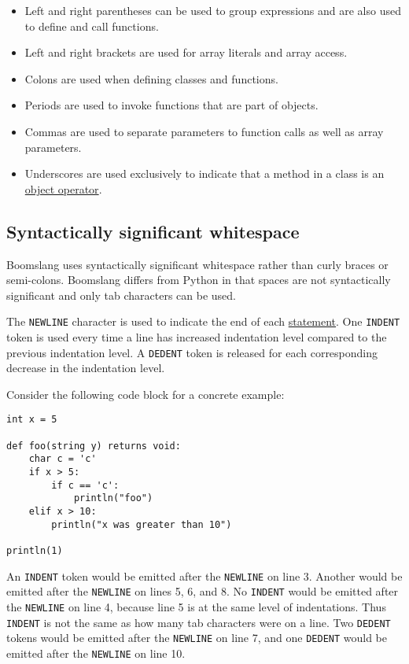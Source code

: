 \documentclass{article}
\begin{document}
\begin{itemize}
\item Left and right parentheses can be used to group expressions and are also used to define and call functions.

\item Left and right brackets are used for array literals and array access.

\item Colons are used when defining classes and functions.

\item Periods are used to invoke functions that are part of objects.

\item Commas are used to separate parameters to function calls as well as array parameters.

\item Underscores are used exclusively to indicate that a method in a class is an \hyperref[sec:object-operators]{object operator}.
\end{itemize}

\subsection{Syntactically significant whitespace}
Boomslang uses syntactically significant whitespace rather than curly braces or semi-colons. Boomslang differs from Python in that spaces are not syntactically significant and only tab characters can be used.

The \texttt{NEWLINE} character is used to indicate the end of each \hyperref[sec:stmt]{statement}. One \texttt{INDENT} token is used every time a line has increased indentation level compared to the previous indentation level. A \texttt{DEDENT} token is released for each corresponding decrease in the indentation level. 

Consider the following code block for a concrete example:
\begin{verbatim}
int x = 5

def foo(string y) returns void:
    char c = 'c'
    if x > 5:
        if c == 'c':
            println("foo")
    elif x > 10:
        println("x was greater than 10")
        
println(1)

\end{verbatim}
An \texttt{INDENT} token would be emitted after the \texttt{NEWLINE} on line 3. Another would be emitted after the \texttt{NEWLINE} on lines 5, 6, and 8. No \texttt{INDENT} would be emitted after the \texttt{NEWLINE} on line 4, because line 5 is at the same level of indentations. Thus \texttt{INDENT} is not the same as how many tab characters were on a line. Two \texttt{DEDENT} tokens would be emitted after the \texttt{NEWLINE} on line 7, and one \texttt{DEDENT} would be emitted after the \texttt{NEWLINE} on line 10.
\end{document}
